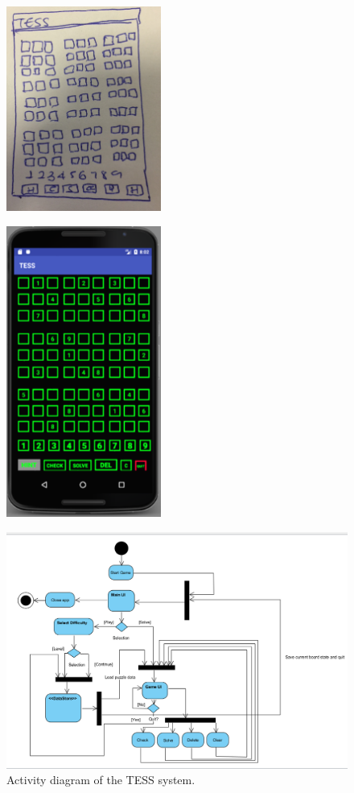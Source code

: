 \documentclass{article}
\begin{document}
\begin{figure}[h]
\centering
\begin{minipage}{.5\textwidth} \centering \includegraphics[width=2in]{./Figure/initial_design.jpg} \label{fig:initialDesign}
\end{minipage}%
\begin{minipage}{.5\textwidth}\centering \includegraphics[width=2.0in]{./Figure/currentBoard.PNG} \label{fig:current}
\end{minipage}%
\end{figure}
\begin{figure}[h]
	\centering
	\includegraphics[width=5in]{./Figure/Activity_Diagram.PNG}
	\caption{Activity diagram of the TESS system.}\label{fig:activitydiagram}
\end{figure}
\end{document}
